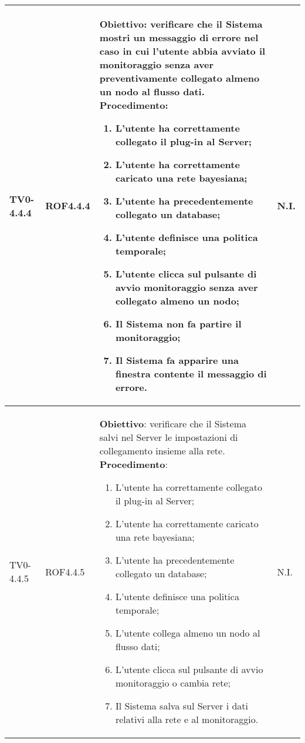 \begin{longtable}{|C{.15\textwidth}|C{.13\textwidth}|m{.65\textwidth}|C{.08\textwidth}|}
TV0-4.4.4 & ROF4.4.4 &
	\textbf{Obiettivo}: verificare che il Sistema mostri un messaggio di errore nel caso in cui l'utente abbia avviato il monitoraggio senza aver preventivamente  collegato almeno un nodo al flusso dati. \newline
	\textbf{Procedimento}:
	\begin{enumerate}
		\item L'utente ha correttamente collegato il plug-in al Server;
		\item L'utente ha correttamente caricato una rete bayesiana;
		\item L'utente ha precedentemente collegato un database;
		\item L'utente definisce una politica temporale;
		\item L'utente clicca sul pulsante di avvio monitoraggio senza aver collegato almeno un nodo;
		\item Il Sistema non fa partire il monitoraggio;
		\item Il Sistema fa apparire una finestra contente il messaggio di errore.
	\end{enumerate}
	& N.I. \\
\hline

TV0-4.4.5 & ROF4.4.5 &
	\textbf{Obiettivo}: verificare che il Sistema salvi nel Server le impostazioni di collegamento insieme alla rete. \newline
	\textbf{Procedimento}:
	\begin{enumerate}
		\item L'utente ha correttamente collegato il plug-in al Server;
		\item L'utente ha correttamente caricato una rete bayesiana;
		\item L'utente ha precedentemente collegato un database;
		\item L'utente definisce una politica temporale;
		\item L'utente collega almeno un nodo al flusso dati;
		\item L'utente clicca sul pulsante di avvio monitoraggio o cambia rete;
		\item Il Sistema salva sul Server i dati relativi alla rete e al monitoraggio.	
	\end{enumerate}
	& N.I. \\
\hline


\end{longtable}
